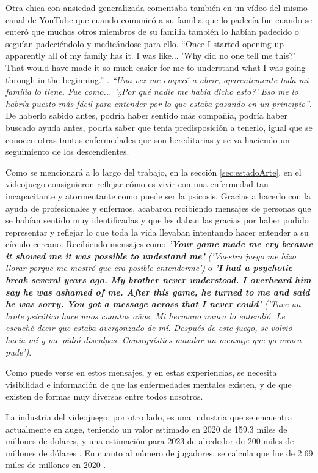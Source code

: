 \documentclass[12pt, a4paper,twoside,titlepage]{book}
\begin{document}
Otra chica con ansiedad generalizada comentaba también en un vídeo del mismo canal de YouTube que cuando comunicó a su familia que lo padecía fue cuando se enteró que muchos otros miembros de su familia también lo habían padecido o seguían padeciéndolo y medicándose para ello. ``Once I started opening up apparently all of my family has it. I was like... 'Why did no one tell me this?' That would have made it so much easier for me to understand what I was going through in the beginning.'' \cite{videoTAG}. \textit{``Una vez me empecé a abrir, aparentemente toda mi familia lo tiene. Fue como... '¿Por qué nadie me había dicho esto?' Eso me lo habría puesto más fácil para entender por lo que estaba pasando en un principio''}. De haberlo sabido antes, podría haber sentido más compañía, podría haber buscado ayuda antes, podría saber que tenía predisposición a tenerlo, igual que se conocen otras tantas enfermedades que son hereditarias y se va haciendo un seguimiento de los descendientes.

Como se mencionará a lo largo del trabajo, en la sección \ref{sec:estadoArte}, en el videojuego  consiguieron reflejar cómo es vivir con una enfermedad tan incapacitante y atormentante como puede ser la psicosis. Gracias a hacerlo con la ayuda de profesionales y enfermos, acabaron recibiendo mensajes de personas que se habían sentido muy identificadas y que les daban las gracias por haber podido representar y reflejar lo que toda la vida llevaban intentando hacer entender a su círculo cercano. Recibiendo mensajes como \textbf{\textit{'Your game made me cry because it showed me it was possible to undestand me'}} \textit{('Vuestro juego me hizo llorar porque me mostró que era posible entenderme')} o \textbf{\textit{'I had a psychotic break several years ago. My brother never understood. I overheard him say he was ashamed of me. After this game, he turned to me and said he was sorry. You got a message across that I never could'}} \textit{('Tuve un brote psicótico hace unos cuantos años. Mi hermano nunca lo entendió. Le escuché decir que estaba avergonzado de mí. Después de este juego, se volvió hacia mí y me pidió disculpas. Conseguísties mandar un mensaje que yo nunca pude')}. 

Como puede verse en estos mensajes, y en estas experiencias, se necesita visibilidad e información de que las enfermedades mentales existen, y de que existen de formas muy diversas entre todos nosotros. 

La industria del videojuego, por otro lado, es una industria que se encuentra actualmente en auge, teniendo un valor estimado en 2020 de 159.3 miles de millones de dolares, y una estimación para 2023 de alrededor de 200 miles de millones de dólares \cite{articuloIntroVideojuegos}. En cuanto al número de jugadores, se calcula que fue de 2.69 miles de millones en 2020 \cite{articuloIntroVideojuegos2}. 
\end{document}
